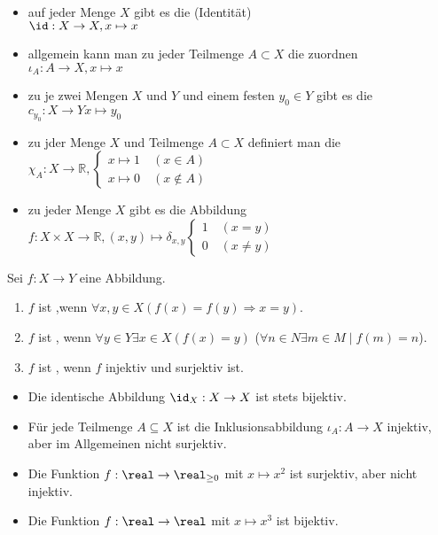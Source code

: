 \begin{example}
	\begin{itemize}
		\item auf jeder Menge $X$ gibt es die  (Identität) \\ $\id: X \to X, x 
		\mapsto x$
		\item allgemein kann man zu jeder Teilmenge $A \subset X$ die  zuordnen
		$\iota_A: A \to X, x \mapsto x$
		\item zu je zwei Mengen $X$ und $Y$ und einem festen $y_0 \in Y$ gibt es die  $c_{y_0}: X \to Y x \mapsto y_0$
		\item zu jder Menge $X$ und Teilmenge $A \subset X$ definiert man die \\ $\chi_A: X \to \mathbb R,
		\begin{cases}
		x \mapsto 1 \quad(x \in A) \\ x \mapsto 0 \quad(x \notin A)
		\end{cases}
		$
		\item zu jeder Menge $X$ gibt es die Abbildung \\ $f: X \times X \to \mathbb R, (x,y) \mapsto
		\delta_{x,y} \begin{cases} 1 \quad (x=y) \\ 0 \quad (x \neq y) \end{cases}$
	\end{itemize}
\end{example}

\begin{definition}
	Sei $f: X \to Y$ eine Abbildung.
	\begin{enumerate}
		\item $f$ ist ,wenn $\forall x,y \in X (f(x) = f(y) \Rightarrow x=y)$.
		\item $f$ ist , wenn $\forall y \in Y \exists x \in X (f(x)=y)$ ($\forall n \in N  \exists m \in M \mid f(m)=n$).
		\item $f$ ist , wenn $f$ injektiv und surjektiv ist.
	\end{enumerate}
\end{definition}

\begin{example}
	\begin{itemize}
		\item Die identische Abbildung $\id_X:X\to X$ ist stets bijektiv.
		\item Für jede Teilmenge $A\subseteq X$ ist die Inklusionsabbildung $\iota_A:A\to X$ injektiv, aber im Allgemeinen nicht surjektiv.
		\item Die Funktion $f:\real\to\real_{\ge 0}$ mit $x\mapsto x^2$ ist surjektiv, aber nicht injektiv.
		\item Die Funktion $f:\real\to\real$ mit $x\mapsto x^3$ ist bijektiv.
	\end{itemize}
\end{example}


